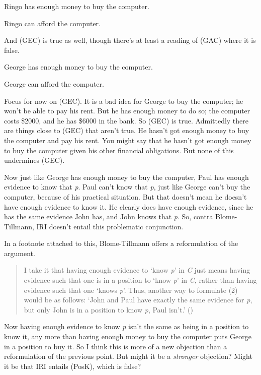 \documentclass[
  10pt,
  letterpaper,
  DIV=11,
  numbers=noendperiod,
  twoside]{scrartcl}
\providecommand{\tightlist}{%
  \setlength{\itemsep}{0pt}\setlength{\parskip}{0pt}}\usepackage{longtable,booktabs,array}
\begin{document}
\begin{description}
\tightlist
\item[(REC)]
Ringo has enough money to buy the computer.
\item[(RAC)]
Ringo can afford the computer.
\end{description}

And (GEC) is true as well, though there's at least a reading of (GAC)
where it is false.

\begin{description}
\tightlist
\item[(GEC)]
George has enough money to buy the computer.
\item[(GAC)]
George can afford the computer.
\end{description}

Focus for now on (GEC). It is a bad idea for George to buy the computer;
he won't be able to pay his rent. But he has enough money to do so; the
computer costs \$2000, and he has \$6000 in the bank. So (GEC) is true.
Admittedly there are things close to (GEC) that aren't true. He hasn't
got enough money to buy the computer and pay his rent. You might say
that he hasn't got enough money to buy the computer given his other
financial obligations. But none of this undermines (GEC).

Now just like George has enough money to buy the computer, Paul has
enough evidence to know that \emph{p}. Paul can't know that \emph{p},
just like George can't buy the computer, because of his practical
situation. But that doesn't mean he doesn't have enough evidence to know
it. He clearly does have enough evidence, since he has the same evidence
John has, and John knows that \emph{p}. So, contra Blome-Tillmann, IRI
doesn't entail this problematic conjunction.

In a footnote attached to this, Blome-Tillmann offers a reformulation of
the argument.

\begin{quote}
I take it that having enough evidence to `know \emph{p}' in \emph{C}
just means having evidence such that one is in a position to `know
\emph{p}' in \emph{C}, rather than having evidence such that one `knows
\emph{p}'. Thus, another way to formulate (2) would be as follows: `John
and Paul have exactly the same evidence for \emph{p}, but only John is
in a position to know \emph{p}, Paul isn't.'
()
\end{quote}

Now having enough evidence to know \emph{p} isn't the same as being in a
position to know it, any more than having enough money to buy the
computer puts George in a position to buy it. So I think this is more of
a new objection than a reformulation of the previous point. But might it
be a \emph{stronger} objection? Might it be that IRI entails (PosK),
which is false?
\end{document}
